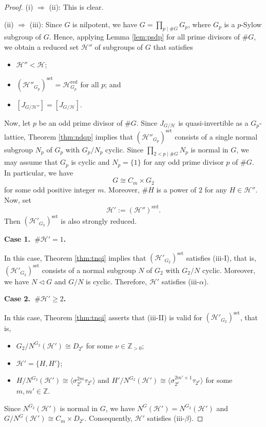 \documentclass[12pt]{amsart}
\theoremstyle{plain}
\theoremstyle{definition}
\numberwithin{thm}{section}
\numberwithin{equation}{section}
\newcommand{\Zpn}{\mathbb{Z}_{>0}}
\newcommand{\Z}{\mathbb{Z}}
\newcommand{\cH}{\mathcal{H}}
\DeclareMathOperator{\red}{red}
\DeclareMathOperator{\set}{set}
\DeclareMathOperator{\srd}{srd}
\begin{document}
\begin{proof}
(i) $\Rightarrow$ (ii): This is clear.

(ii) $\Rightarrow$ (iii): Since $G$ is nilpotent, we have $G=\prod_{p\mid \#G}G_{p}$, where $G_{p}$ is a $p$-Sylow subgroup of $G$. Hence, applying Lemma \ref{lem:psdp} for all prime divisors of $\#G$, we obtain a reduced set $\cH''$ of subgroups of $G$ that satisfies
\begin{itemize}
\item $\cH''<\cH$;
\item $(\cH''_{G_{p}})^{\set}=\cH_{G_{p}}^{\red}$ for all $p$; and
\item $[J_{G/\cH''}]=[J_{G/\cH}]$. 
\end{itemize}
Now, let $p$ be an odd prime divisor of $\#G$. Since $J_{G/\cH}$ is quasi-invertible as a $G_{p}$-lattice, Theorem \ref{thm:ndqp} implies that $(\cH''_{G_{p}})^{\set}$ consists of a single normal subgroup $N_{p}$ of $G_{p}$ with $G_{p}/N_{p}$ cyclic. Since $\prod_{2<p\mid \#G}N_{p}$ is normal in $G$, we may assume that $G_{p}$ is cyclic and $N_{p}=\{1\}$ for any odd prime divisor $p$ of $\#G$. In particular, we have
\begin{equation*}
    G\cong C_{m}\times G_{2}
\end{equation*}
for some odd positive integer $m$. Moreover, $\#H$ is a power of $2$ for any $H\in \cH''$. Now, set
\begin{equation*}
    \cH':=(\cH'')^{\srd}. 
\end{equation*}
Then $(\cH'_{G_{2}})^{\set}$ is also strongly reduced.  

\textbf{Case 1.~$\#\cH'=1$. }

In this case, Theorem \ref{thm:tnqi} implies that $(\cH'_{G_{2}})^{\set}$ satisfies (iii-I), that is, $(\cH'_{G_{2}})^{\set}$ consists of a normal subgroup $N$ of $G_{2}$ with $G_{2}/N$ cyclic. Moreover, we have $N\triangleleft G$ and $G/N$ is cyclic. Therefore, $\cH'$ satisfies (iii-$\alpha$). 

\textbf{Case 2.~$\#\cH' \geq 2$. }

In this case, Theorem \ref{thm:tnqi} asserts that (iii-I\hspace{-1pt}I) is valid for $(\cH'_{G_{2}})^{\set}$, that is, 
\begin{itemize}
\item $G_{2}/N^{G_{2}}(\cH') \cong D_{2^{\nu}}$ for some $\nu \in \Zpn$; 
\item $\cH'=\{H,H'\}$; 
\item $H/N^{G_{2}}(\cH')\cong \langle \sigma_{2^{\nu}}^{2m}\tau_{2^{\nu}} \rangle$ and $H'/{N^{G_{2}}(\cH')}\cong \langle \sigma_{2^{\nu}}^{2m'+1}\tau_{2^{\nu}} \rangle$ for some $m,m'\in \Z$. 
\end{itemize}
Since $N^{G_{2}}(\cH')$ is normal in $G$, we have $N^{G}(\cH')=N^{G_{2}}(\cH')$ and $G/N^{G}(\cH')\cong C_{m}\times D_{2^{\nu}}$. Consequently, $\cH'$ satisfies (iii-$\beta$). 


\end{proof}
\end{document}
